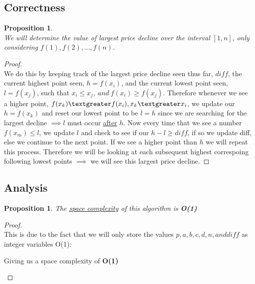 \documentclass[12pt]{article}
\newtheorem{proposition}[theorem]{Proposition}
\begin{document}

\subsection{Correctness}
\begin{proposition}
~ \\ \indent We will determine the value of largest price decline over the interval $[1, n]$,
only considering $f(1), f(2),..., f(n)$.
\end{proposition}

\begin{proof}
~ \\ \indent We do this by keeping track of the largest price decline seen thus far, $diff$,
the current highest point seen, $h = f(x_i)$, and the current lowest point seen, $l = f(x_j)$,
such that $x_i \leq x_j,\ and\ f(x_i) \geq f(x_j)$. Therefore whenever we see a higher point,
$f(x_k) \textgreater f(x_i), x_k \textgreater x_i$, we update our $h = f(x_k)$ and reset our
lowest point to be $l = h$ since we are searching for the largest decline $\implies l$ must
occur \underline{after} $h$. Now every time that we see a number $f(x_m) \leq l$, we update
$l$ and check to see if our $h - l \geq diff$, if so we update diff, else we continue to the
next point.  If we see a higher point than $h$ we will repeat this process. Therefore we will
be looking at each subsequent highest correspoing following lowest points $\implies$ we will
see this largest price decline.
\end{proof}


\subsection{Analysis}

\begin{proposition}
\label{numq}
The \underline{space complexity} of this algorithm is \textbf{O(1)}
\end{proposition}

\begin{proof}
~ \\ \indent This is due to the fact that we will only store the values $p, a, b, c, d, n, and diff$
as integer variables O(1):
\begin{center}
    Giving us a space complexity of \textbf{O(1)}
\end{center}
\end{proof}
\end{document}
